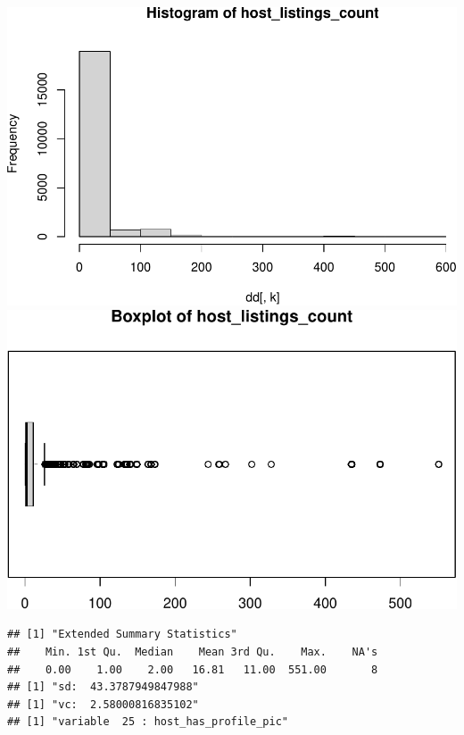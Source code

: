 \includegraphics{anal_files/figure-latex/unnamed-chunk-7-10.pdf}
\includegraphics{anal_files/figure-latex/unnamed-chunk-7-11.pdf}

\begin{verbatim}
## [1] "Extended Summary Statistics"
##    Min. 1st Qu.  Median    Mean 3rd Qu.    Max.    NA's 
##    0.00    1.00    2.00   16.81   11.00  551.00       8 
## [1] "sd:  43.3787949847988"
## [1] "vc:  2.58000816835102"
## [1] "variable  25 : host_has_profile_pic"
\end{verbatim}

